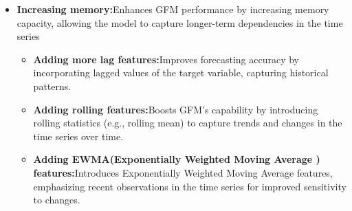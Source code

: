\documentclass{article}
\begin{document}
\begin{itemize}
    \item \textbf{Increasing memory:}Enhances GFM performance by increasing memory capacity, allowing the model to capture longer-term dependencies in the time series
    \begin{itemize}
    \item \textbf{Adding more lag features:}Improves forecasting accuracy by incorporating lagged values of the target variable, capturing historical patterns.
    \item \textbf{Adding rolling features:}Boosts GFM's capability by introducing rolling statistics (e.g., rolling mean) to capture trends and changes in the time series over time.
    \item \textbf{Adding EWMA(Exponentially Weighted Moving Average ) features:}Introduces Exponentially Weighted Moving Average features, emphasizing recent observations in the time series for improved sensitivity to changes.
    \end{itemize}
    

\end{itemize}
\end{document}
